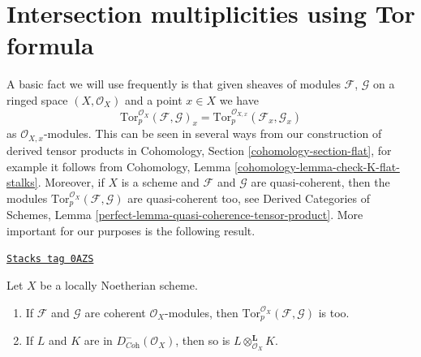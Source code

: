 \section{Intersection multiplicities using Tor formula}
\label{intersection-section-tor-formula}
A basic fact we will use frequently is that given sheaves of
modules $\mathcal{F}$, $\mathcal{G}$ on a ringed space $(X, \mathcal{O}_X)$
and a point $x \in X$ we have
$$
\text{Tor}_p^{\mathcal{O}_X}(\mathcal{F}, \mathcal{G})_x =
\text{Tor}_p^{\mathcal{O}_{X, x}}(\mathcal{F}_x, \mathcal{G}_x)
$$
as $\mathcal{O}_{X, x}$-modules. This can be seen in several ways
from our construction of derived tensor products in
Cohomology, Section \ref{cohomology-section-flat}, for example it follows from
Cohomology, Lemma \ref{cohomology-lemma-check-K-flat-stalks}.
Moreover, if $X$ is a scheme and $\mathcal{F}$ and $\mathcal{G}$
are quasi-coherent, then the modules
$\text{Tor}_p^{\mathcal{O}_X}(\mathcal{F}, \mathcal{G})$ are
quasi-coherent too, see
Derived Categories of Schemes, Lemma
\ref{perfect-lemma-quasi-coherence-tensor-product}.
More important for our purposes is the following result.

\begin{lemma}
\label{intersection-lemma-tensor-coherent}
\href{https://stacks.math.columbia.edu/tag/0AZS}{\texttt{Stacks tag 0AZS}}

Let $X$ be a locally Noetherian scheme.
\begin{enumerate}
\item If $\mathcal{F}$ and $\mathcal{G}$ are coherent $\mathcal{O}_X$-modules,
then $\text{Tor}_p^{\mathcal{O}_X}(\mathcal{F}, \mathcal{G})$ is too.
\item If $L$ and $K$ are in $D^-_{\textit{Coh}}(\mathcal{O}_X)$, then
so is $L \otimes_{\mathcal{O}_X}^\mathbf{L} K$.
\end{enumerate}
\end{lemma}

